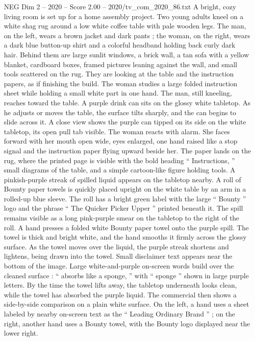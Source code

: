\begin{textsample}{NEG Dim 2 – 2020 – Score 2.00 – 2020/tv\_com\_2020\_86.txt}  \label{ex:f2_neg_059}
A bright, cozy living room is set up for a home assembly project.
Two young adults kneel on a white shag rug around a low white coffee table with pale wooden legs.
The man, on the left, wears a brown jacket and dark pants ; the woman, on the right, wears a dark blue button-up shirt and a colorful headband holding back curly dark hair.
Behind them are large sunlit windows, a brick wall, a tan sofa with a yellow blanket, cardboard boxes, framed pictures leaning against the wall, and small tools scattered on the rug.
They are looking at the table and the instruction papers, as if finishing the build.
The woman studies a large folded instruction sheet while holding a small white part in one hand.
The man, still kneeling, reaches toward the table.
A purple drink can sits on the glossy white tabletop.
As he adjusts or moves the table, the surface tilts sharply, and the can begins to slide across it.
A close view shows the purple can tipped on its side on the white tabletop, its open pull tab visible.
The woman reacts with alarm.
She faces forward with her mouth open wide, eyes enlarged, one hand raised like a stop signal and the instruction paper flying upward beside her.
The paper lands on the rug, where the printed page is visible with the bold heading “ Instructions, ” small diagrams of the table, and a simple cartoon-like figure holding tools.
A pinkish-purple streak of spilled liquid appears on the tabletop nearby.
A roll of Bounty paper towels is quickly placed upright on the white table by an arm in a rolled-up blue sleeve.
The roll has a bright green label with the large “ Bounty ” logo and the phrase “ The Quicker Picker Upper ” printed beneath it.
The spill remains visible as a long pink-purple smear on the tabletop to the right of the roll.
A hand presses a folded white Bounty paper towel onto the purple spill.
The towel is thick and bright white, and the hand smooths it firmly across the glossy surface.
As the towel moves over the liquid, the purple streak shortens and lightens, being drawn into the towel.
Small disclaimer text appears near the bottom of the image.
Large white-and-purple on-screen words build over the cleaned surface : “ absorbs like a sponge, ” with “ sponge ” shown in large purple letters.
By the time the towel lifts away, the tabletop underneath looks clean, while the towel has absorbed the purple liquid.
The commercial then shows a side-by-side comparison on a plain white surface.
On the left, a hand uses a sheet labeled by nearby on-screen text as the “ Leading Ordinary Brand ” ; on the right, another hand uses a Bounty towel, with the Bounty logo displayed near the lower right.

\end{textsample}
